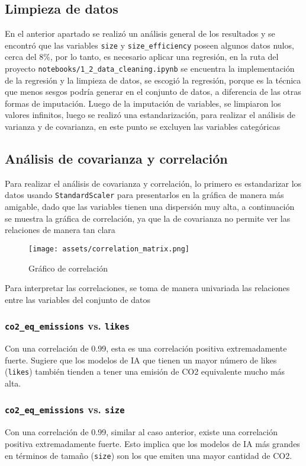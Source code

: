 \documentclass[journal]{IEEEtran}
\begin{document}
	\subsection{Limpieza de datos}
	En el anterior apartado se realizó un análisis general de los resultados y se encontró que las variables \texttt{size} y \texttt{size\_efficiency} poseen algunos datos nulos, cerca del 8\%, por lo tanto, es necesario aplicar una regresión, en la ruta del proyecto \texttt{notebooks/1\_2\_data\_cleaning.ipynb} se encuentra la implementación de la regresión y la limpieza de datos, se escogió la regresión, porque es la técnica que menos sesgos podría generar en el conjunto de datos, a diferencia de las otras formas de imputación.
	Luego de la imputación de variables, se limpiaron los valores infinitos, luego se realizó una estandarización, para realizar el análisis de varianza y de covarianza, en este punto se excluyen las variables categóricas

	\subsection{Análisis de covarianza y correlación}
	Para realizar el análisis de covarianza y correlación, lo primero es estandarizar los datos usando \texttt{StandardScaler} para presentarlos en la gráfica de manera más amigable, dado que las variables tienen una dispersión muy alta, a continuación se muestra la gráfica de correlación, ya que la de covarianza no permite ver las relaciones de manera tan clara

	\begin{figure}[H]
		\centering
		\texttt{[image: assets/correlation\_matrix.png]}
		\caption{Gráfico de correlación}
		\label{fig:pca_scatter}
	\end{figure}
	Para interpretar las correlaciones, se toma de manera univariada las relaciones entre las variables del conjunto de datos
	\subsubsection{\texttt{co2\_eq\_emissions} vs. \texttt{likes}}

	Con una correlación de 0.99, esta es una correlación positiva extremadamente fuerte. Sugiere que los modelos de IA que tienen un mayor número de likes
	(\texttt{likes}) también tienden a tener una emisión de CO2 equivalente mucho más alta.
	\subsubsection{\texttt{co2\_eq\_emissions} vs. \texttt{size}}
	Con una correlación de 0.99, similar al caso anterior, existe una correlación positiva extremadamente fuerte. Esto implica que los modelos de IA más grandes en términos de tamaño (\texttt{size}) son los que emiten una mayor cantidad de CO2.
\end{document}
